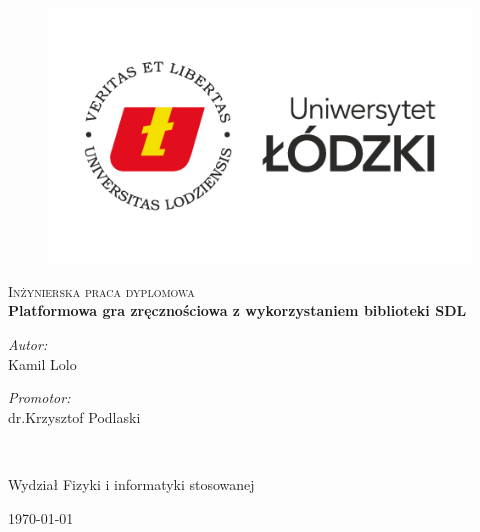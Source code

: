 \documentclass[12pt, a4paper, oneside]{Thesis} %
\begin{document}
\begin{titlepage}
\begin{center}

\begin{figure}
    \centering
    \includegraphics[width=\linewidth]{./Pictures/logo.jpg}
\end{figure}

\textsc{\Large Inżynierska praca dyplomowa \newline }\\[0.5cm] 


{\huge \bfseries Platformowa gra zręcznościowa z wykorzystaniem biblioteki SDL }\\[0.4cm] %

\addvspace{110pt}
 
\begin{minipage}{0.4\textwidth}
\begin{flushleft} \large
\emph{Autor:}\\
Kamil Lolo 
\end{flushleft}
\end{minipage}
\begin{minipage}{0.4\textwidth}
\begin{flushright} \large
\emph{Promotor:} \\
dr.Krzysztof Podlaski
\end{flushright}
\end{minipage}\\[3cm]


\vfill
\addvspace{20pt}
\begin{center}
Wydział Fizyki i informatyki stosowanej
\end{center}
{\large \today}\\[4cm] %


\end{center}
\end{titlepage}
\end{document}
